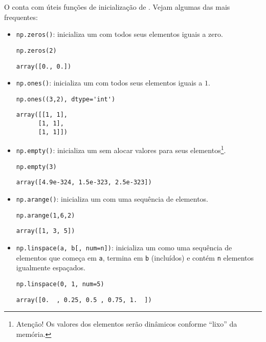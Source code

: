 \documentclass[a4paper,10pt,twoside]{article}
\begin{document}
O {\numpy} conta com úteis funções de inicialização de {\PYTHONnumpyDOTarray}. Vejam algumas das mais frequentes:
\begin{itemize}
\item \texttt{np.zeros()}: inicializa um {\PYTHONnumpyDOTarray} com todos seus elementos iguais a zero.
  
\begin{lstlisting}
np.zeros(2)
\end{lstlisting}

\begin{verbatim}
array([0., 0.])
\end{verbatim}

  \item \texttt{np.ones()}: inicializa um {\PYTHONnumpyDOTarray} com todos seus elementos iguais a $1$.

\begin{lstlisting}
np.ones((3,2), dtype='int')
\end{lstlisting}

\begin{verbatim}
array([[1, 1],
      [1, 1],
      [1, 1]])
\end{verbatim}

  \item \texttt{np.empty()}: inicializa um {\PYTHONnumpyDOTarray} sem alocar valores para seus elementos\footnote{Atenção! Os valores dos elementos serão dinâmicos conforme ``lixo'' da memória.}.
  
\begin{lstlisting}
np.empty(3)
\end{lstlisting}

\begin{verbatim}
array([4.9e-324, 1.5e-323, 2.5e-323])
\end{verbatim}

  \item \texttt{np.arange()}: inicializa um {\PYTHONnumpyDOTarray} com uma sequência de elementos.

\begin{lstlisting}
np.arange(1,6,2)
\end{lstlisting}

\begin{verbatim}
array([1, 3, 5])
\end{verbatim}

  \item \texttt{np.linspace(a, b[, num=n])}: inicializa um {\PYTHONnumpyDOTarray} como uma sequência de elementos que começa em \texttt{a}, termina em \texttt{b} (incluídos) e contém \texttt{n} elementos igualmente espaçados.

\begin{lstlisting}
np.linspace(0, 1, num=5)
\end{lstlisting}

\begin{verbatim}
array([0.  , 0.25, 0.5 , 0.75, 1.  ])
\end{verbatim}

\end{itemize}
\end{document}
